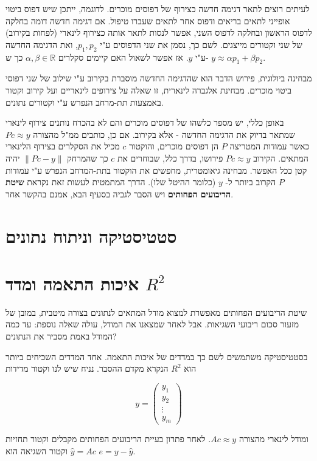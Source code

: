 \documentclass[12pt]{report}
\theoremstyle{plain}
\theoremstyle{definition}
\newcommand{\R}{\mathbb{R}}
\newcommand{\0}{\mathbf{0}}
\begin{document}
לעיתים רוצים לתאר דגימה חדשה כצירוף של דפוסים מוכרים. לדוגמה, ייתכן שיש דפוס ביטוי אופייני לתאים בריאים ודפוס אחר לתאים שעברו טיפול. אם דגימה חדשה דומה בחלקה לדפוס הראשון ובחלקה לדפוס השני, אפשר לנסות לתאר אותה כצירוף לינארי (לפחות בקירוב) של שני וקטורים מייצגים. לשם כך, נסמן את שני הדפוסים ע"י
$p_1,p_2$,
ואת הדגימה החדשה ע"י
$y$.
אז אפשר לשאול האם קיימים סקלרים
$
\alpha,\beta\in\R
$
כך ש-
$y \approx \alpha p_1+\beta p_2$.

מבחינה ביולוגית, פירוש הדבר הוא שהדגימה החדשה מוסברת בקירוב ע"י שילוב של שני דפוסי ביטוי מוכרים.
מבחינת אלגברה לינארית, זו שאלה על צירופים לינאריים ועל קירוב וקטור באמצעות תת-מרחב הנפרש ע"י וקטורים נתונים.

באופן כללי, יש מספר כלשהו של דפוסים מוכרים והם לא בהכרח נותנים צירוף לינארי שמתאר בדיוק את הדגימה החדשה - אלא בקירוב. אם כן, כותבים ממ"ל מהצורה
$P c \approx y$
כאשר עמודות המטריצה
$P$
הן דפוסים מוכרים, והוקטור
$c$
מכיל את הסקלרים בצירוף הלינארי המתאים. הקירוב
$Pc \approx y$
פירושו, בדרך כלל, שבוחרים את
$c$
כך שהמרחק
$\|Pc-y\|$
יהיה קטן ככל האפשר.
מבחינה גיאומטרית, מחפשים את הוקטור בתת-המרחב הנפרש ע"י עמודות
$P$
הקרוב ביותר ל-
$y$
(כלומר ההיטל שלו).
הדרך המתמטית לעשות זאת נקראת
\textbf{שיטת הריבועים הפחותים}
ויש הסבר לגביה בסעיף הבא, אמנם בהקשר אחר.

\section{סטטיסטיקה וניתוח נתונים}\label{section:statistics}

\section*{איכות התאמה ומדד $R^2$}

שיטת הריבועים הפחותים מאפשרת למצוא מודל המתאים לנתונים בצורה מיטבית, במובן של מזעור סכום ריבועי השגיאות. אבל לאחר שמצאנו את המודל, עולה שאלה נוספת: עד כמה המודל באמת מסביר את הנתונים?

בסטטיסטיקה משתמשים לשם כך במדדים של איכות התאמה.
אחד המדדים השכיחים ביותר הוא
$R^2$
הנקרא מקדם ההסבר. נניח שיש לנו וקטור מדידות

$$
y=
\begin{pmatrix}
y_1\\
y_2\\
\vdots\\
y_m
\end{pmatrix}
$$

ומודל לינארי מהצורה
$Ac\approx y$.
לאחר פתרון בעיית הריבועים הפחותים מקבלים וקטור תחזיות
$\hat{y}=Ac$
וקטור השגיאה הוא
$e=y-\hat{y}$.
\end{document}
